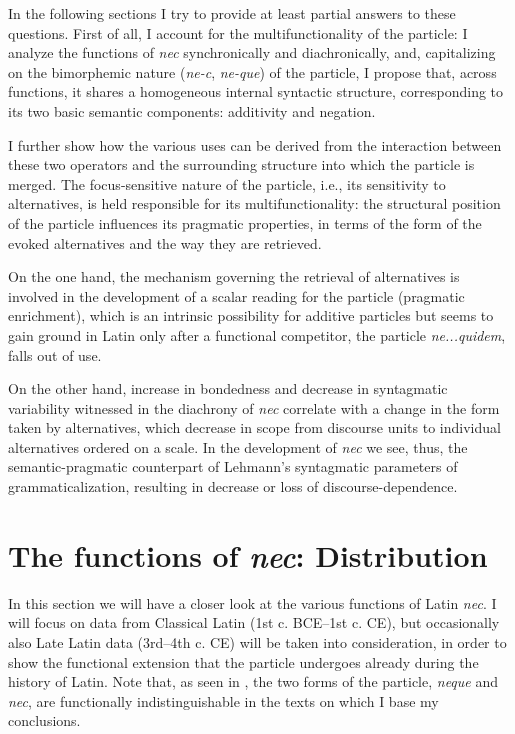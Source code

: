 \documentclass[output=paper]{langsci/langscibook}
\begin{document}
In the following sections I try to provide at least partial answers to these questions. First of all, I account for the multifunctionality of the particle: I analyze the functions of {\emph{nec}} synchronically and diachronically, and, capitalizing on the bimorphemic nature ({\emph{ne-c}}, {\emph{ne-que}}) of the particle, I propose that, across functions, it shares a homogeneous internal syntactic structure, corresponding to its two basic semantic components: additivity and negation.

I further show how the various uses can be derived from the interaction between these two operators and the surrounding structure into which the particle is merged. The focus-sensitive nature of the particle, i.e., its sensitivity to alternatives, is held responsible for its multifunctionality: the structural position of the particle influences its pragmatic properties, in terms of the form of the evoked alternatives and the way they are retrieved.

On the one hand, the mechanism governing the retrieval of alternatives is involved in the development of a scalar reading for the particle (pragmatic enrichment), which is an intrinsic possibility for additive particles but seems to gain ground in Latin only after a functional competitor, the particle {\emph{ne...quidem}}, falls out of use.

On the other hand, increase in bondedness and decrease in syntagmatic variability witnessed in the diachrony of {\emph{nec}} correlate with a change in the form taken by alternatives, which decrease in scope from discourse units to individual alternatives ordered on a scale. In the development of {\emph{nec}} we see, thus, the semantic-pragmatic counterpart of Lehmann's syntagmatic parameters of grammaticalization, resulting in decrease or loss of discourse-dependence.

\section{The functions of {\emph{nec}}: Distribution} \label{distributionfunctions}

In this section we will have a closer look at the various functions of Latin {\emph{nec}}. I will focus on data from Classical Latin (1st c. BCE--1st c. CE), but occasionally also Late Latin data (3rd--4th c. CE) will be taken into consideration, in order to show the functional extension that the particle undergoes already during the history of Latin. Note that, as seen in , the two forms of the particle, {\emph{neque}} and {\emph{nec}}, are functionally indistinguishable in the texts on which I base my conclusions.
\end{document}
